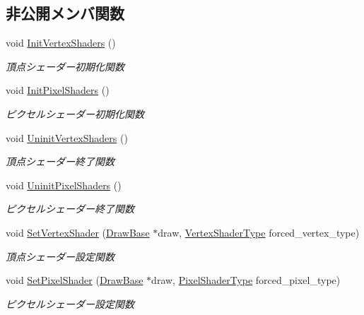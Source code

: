 \subsection*{非公開メンバ関数}
\begin{DoxyCompactItemize}
\item 
void \mbox{\hyperlink{class_shader_manager_a9881e89daff32662e10f6ac48212ca06}{Init\+Vertex\+Shaders}} ()
\begin{DoxyCompactList}\small\item\em 頂点シェーダー初期化関数 \end{DoxyCompactList}\item 
void \mbox{\hyperlink{class_shader_manager_a6e1c2dc6c381081bc0e5ef1624b8e0f0}{Init\+Pixel\+Shaders}} ()
\begin{DoxyCompactList}\small\item\em ピクセルシェーダー初期化関数 \end{DoxyCompactList}\item 
void \mbox{\hyperlink{class_shader_manager_af3b8f2931857016315e018041321f35a}{Uninit\+Vertex\+Shaders}} ()
\begin{DoxyCompactList}\small\item\em 頂点シェーダー終了関数 \end{DoxyCompactList}\item 
void \mbox{\hyperlink{class_shader_manager_a1edd1b68c7949022217f98bce8360d3c}{Uninit\+Pixel\+Shaders}} ()
\begin{DoxyCompactList}\small\item\em ピクセルシェーダー終了関数 \end{DoxyCompactList}\item 
void \mbox{\hyperlink{class_shader_manager_a3661a079ae4e9e7e4d5da35f2171b41e}{Set\+Vertex\+Shader}} (\mbox{\hyperlink{class_draw_base}{Draw\+Base}} $\ast$draw, \mbox{\hyperlink{class_shader_manager_a9b51e49d70eb3cc58f6d1f3994e8cfbd}{Vertex\+Shader\+Type}} forced\+\_\+vertex\+\_\+type)
\begin{DoxyCompactList}\small\item\em 頂点シェーダー設定関数 \end{DoxyCompactList}\item 
void \mbox{\hyperlink{class_shader_manager_a6c954293001a33fafff216ff719618d5}{Set\+Pixel\+Shader}} (\mbox{\hyperlink{class_draw_base}{Draw\+Base}} $\ast$draw, \mbox{\hyperlink{class_shader_manager_a7d15d773b3c6a99dd7086c45c8b0be5f}{Pixel\+Shader\+Type}} forced\+\_\+pixel\+\_\+type)
\begin{DoxyCompactList}\small\item\em ピクセルシェーダー設定関数 \end{DoxyCompactList}\item 

\end{DoxyCompactItemize}
